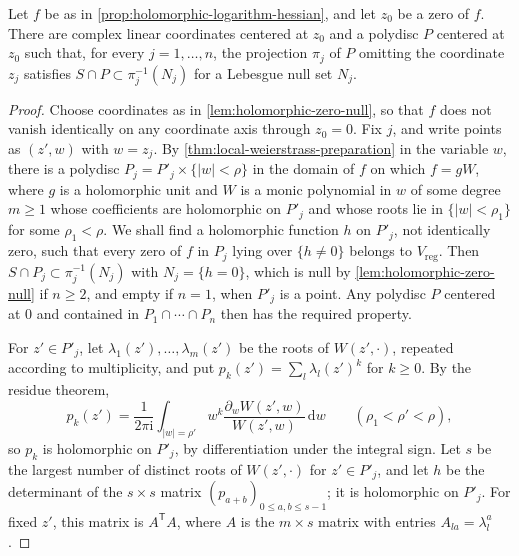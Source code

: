\begin{lemma}\label{lem:divisor-exceptional-projections}
Let $f$ be as in \cref{prop:holomorphic-logarithm-hessian}, and let $z_0$ be a zero of $f$. There are complex linear coordinates centered at $z_0$ and a polydisc $P$ centered at $z_0$ such that, for every $j=1,\ldots,n$, the projection $\pi_j$ of $P$ omitting the coordinate $z_j$ satisfies $S\cap P\subset\pi_j^{-1}(N_j)$ for a Lebesgue null set $N_j$.
\end{lemma}
\begin{proof}
Choose coordinates as in \cref{lem:holomorphic-zero-null}, so that $f$ does not vanish identically on any coordinate axis through $z_0=0$. Fix $j$, and write points as $(z',w)$ with $w=z_j$. By \cref{thm:local-weierstrass-preparation} in the variable $w$, there is a polydisc $P_j=P'_j\times\{|w|<\rho\}$ in the domain of $f$ on which $f=gW$, where $g$ is a holomorphic unit and $W$ is a monic polynomial in $w$ of some degree $m\geq1$ whose coefficients are holomorphic on $P'_j$ and whose roots lie in $\{|w|<\rho_1\}$ for some $\rho_1<\rho$. We shall find a holomorphic function $h$ on $P'_j$, not identically zero, such that every zero of $f$ in $P_j$ lying over $\{h\neq0\}$ belongs to $V_{\mathrm{reg}}$. Then $S\cap P_j\subset\pi_j^{-1}(N_j)$ with $N_j=\{h=0\}$, which is null by \cref{lem:holomorphic-zero-null} if $n\geq2$, and empty if $n=1$, when $P'_j$ is a point. Any polydisc $P$ centered at $0$ and contained in $P_1\cap\cdots\cap P_n$ then has the required property.

For $z'\in P'_j$, let $\lambda_1(z'),\ldots,\lambda_m(z')$ be the roots of $W(z',\cdot)$, repeated according to multiplicity, and put $p_k(z')=\sum_l\lambda_l(z')^k$ for $k\geq0$. By the residue theorem,
\[
 p_k(z')=\frac1{2\pi\mathrm i}\int_{|w|=\rho'}w^k\frac{\partial_wW(z',w)}{W(z',w)}\,\mathrm dw\qquad(\rho_1<\rho'<\rho),
\]
so $p_k$ is holomorphic on $P'_j$, by differentiation under the integral sign. Let $s$ be the largest number of distinct roots of $W(z',\cdot)$ for $z'\in P'_j$, and let $h$ be the determinant of the $s\times s$ matrix $(p_{a+b})_{0\leq a,b\leq s-1}$; it is holomorphic on $P'_j$. For fixed $z'$, this matrix is $A^{\mathsf T}A$, where $A$ is the $m\times s$ matrix with entries $A_{la}=\lambda_l^a$.


\end{proof}
